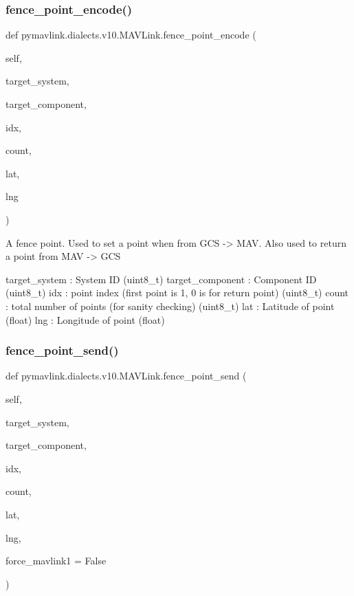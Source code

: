 \begin{DoxyVerb}
\begin{DoxyVerb}
\subsubsection{\texorpdfstring{fence\+\_\+point\+\_\+encode()}{fence\_point\_encode()}}
{\footnotesize\ttfamily def pymavlink.\+dialects.\+v10.\+M\+A\+V\+Link.\+fence\+\_\+point\+\_\+encode (\begin{DoxyParamCaption}\item[{}]{self,  }\item[{}]{target\+\_\+system,  }\item[{}]{target\+\_\+component,  }\item[{}]{idx,  }\item[{}]{count,  }\item[{}]{lat,  }\item[{}]{lng }\end{DoxyParamCaption})}

\begin{DoxyVerb}A fence point. Used to set a point when from GCS -> MAV. Also used to
return a point from MAV -> GCS

target_system             : System ID (uint8_t)
target_component          : Component ID (uint8_t)
idx                       : point index (first point is 1, 0 is for return point) (uint8_t)
count                     : total number of points (for sanity checking) (uint8_t)
lat                       : Latitude of point (float)
lng                       : Longitude of point (float)\end{DoxyVerb}
 \mbox{\label{classpymavlink_1_1dialects_1_1v10_1_1MAVLink_a474b211df1601df1f84c89ba820b1ac9}} 
\subsubsection{\texorpdfstring{fence\+\_\+point\+\_\+send()}{fence\_point\_send()}}
{\footnotesize\ttfamily def pymavlink.\+dialects.\+v10.\+M\+A\+V\+Link.\+fence\+\_\+point\+\_\+send (\begin{DoxyParamCaption}\item[{}]{self,  }\item[{}]{target\+\_\+system,  }\item[{}]{target\+\_\+component,  }\item[{}]{idx,  }\item[{}]{count,  }\item[{}]{lat,  }\item[{}]{lng,  }\item[{}]{force\+\_\+mavlink1 = {\ttfamily False} }\end{DoxyParamCaption})}


\end{DoxyVerb}
\end{DoxyVerb}

